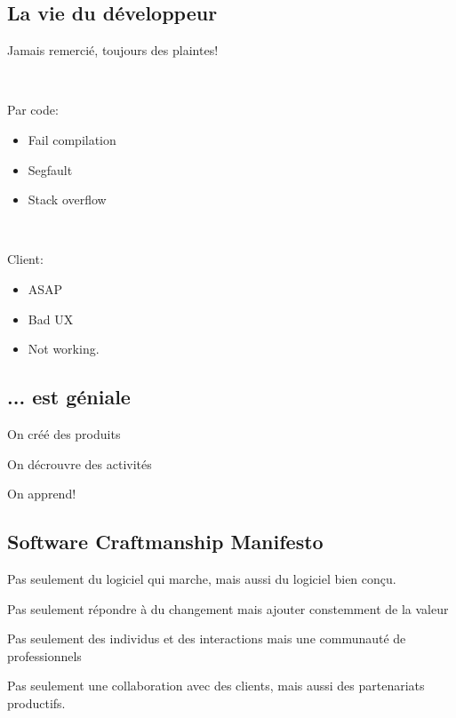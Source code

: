 \documentclass[a4paper,11pt]{article}
\begin{document}
\subsection{La vie du développeur}

Jamais remercié, toujours des plaintes!

\

Par code:

\begin{itemize}

\item Fail compilation

\item Segfault

\item Stack overflow

\end{itemize}

\

Client:

\begin{itemize}

\item ASAP

\item Bad UX

\item Not working.

\end{itemize}

\subsection{... est géniale}

On créé des produits

On décrouvre des activités

On apprend!

\subsection{Software Craftmanship Manifesto}

Pas seulement du logiciel qui marche, mais aussi du logiciel bien conçu.

Pas seulement répondre à du changement mais ajouter constemment de la valeur

Pas seulement des individus et des interactions mais une communauté de
professionnels

Pas seulement une collaboration avec des clients, mais aussi des partenariats
productifs.
\end{document}
